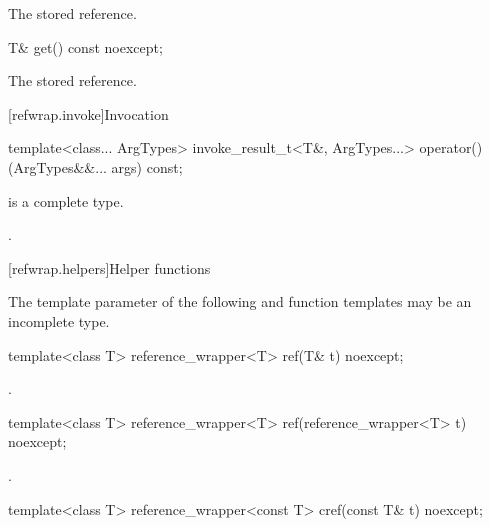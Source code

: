 \begin{itemdescr}
\pnum\returns The stored reference.
\end{itemdescr}

%
\begin{itemdecl}
T& get() const noexcept;
\end{itemdecl}

\begin{itemdescr}
\pnum\returns The stored reference.
\end{itemdescr}

[refwrap.invoke]{Invocation}

%
\begin{itemdecl}
template<class... ArgTypes>
  invoke_result_t<T&, ArgTypes...>
    operator()(ArgTypes&&... args) const;
\end{itemdecl}

\begin{itemdescr}
\pnum
\mandates
{} is a complete type.

\pnum\returns {}.
\end{itemdescr}


[refwrap.helpers]{Helper functions}

\pnum
The template parameter  of
the following  and  function templates
may be an incomplete type.

%
\begin{itemdecl}
template<class T> reference_wrapper<T> ref(T& t) noexcept;
\end{itemdecl}

\begin{itemdescr}
\pnum\returns {}.
\end{itemdescr}

%
\begin{itemdecl}
template<class T> reference_wrapper<T> ref(reference_wrapper<T> t) noexcept;
\end{itemdecl}

\begin{itemdescr}
\pnum\returns {}.
\end{itemdescr}

%
\begin{itemdecl}
template<class T> reference_wrapper<const T> cref(const T& t) noexcept;
\end{itemdecl}


